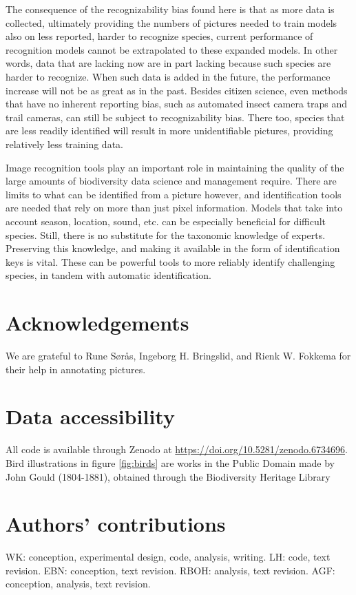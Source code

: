 \documentclass{article}
\begin{document}
The consequence of the recognizability bias found here is that as more data is collected, ultimately providing the numbers of pictures needed to train models also on less reported, harder to recognize species, current performance of recognition models cannot be extrapolated to these expanded models. In other words, data that are lacking now are in part lacking because such species are harder to recognize. When such data is added in the future, the performance increase will not be as great as in the past. Besides citizen science, even methods that have no inherent reporting bias, such as automated insect camera traps and trail cameras, can still be subject to recognizability bias. There too, species that are less readily identified will result in more unidentifiable pictures, providing relatively less training data.

Image recognition tools play an important role in maintaining the quality of the large amounts of biodiversity data science and management require. There are limits to what can be identified from a picture however, and identification tools are needed that rely on more than just pixel information. Models that take into account season, location, sound, etc. can be especially beneficial for difficult species. Still, there is no substitute for the taxonomic knowledge of experts. Preserving this knowledge, and making it available in the form of identification keys is vital. These can be powerful tools to more reliably identify challenging species, in tandem with automatic identification.



\section*{Acknowledgements}
We are grateful to Rune Sørås, Ingeborg H. Bringslid, and Rienk W. Fokkema for their help in annotating pictures.

\section*{Data accessibility}
All code is available through Zenodo at \url{https://doi.org/10.5281/zenodo.6734696}. Bird illustrations in figure \ref{fig:birds} are works in the Public Domain made by John Gould (1804-1881), obtained through the Biodiversity Heritage Library~\cite{bhl1,bhl2,bhl3}

\section*{Authors’ contributions}
WK: conception, experimental design, code, analysis, writing. LH: code, text revision. EBN: conception, text revision. RBOH: analysis, text revision. AGF: conception, analysis, text revision.
\end{document}
